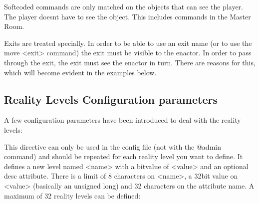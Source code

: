 \documentclass[letterpaper,10pt,english]{sphinxmanual}
\begin{document}
\sphinxAtStartPar
Softcoded commands are only matched on the objects that can see the player.
The player doesn\textquotesingle{}t have to see the object. This includes commands in the
Master Room.

\sphinxAtStartPar
Exits are treated specially. In order to be able to use an exit name (or to
use the \textquotesingle{}move \textless{}exit\textgreater{}\textquotesingle{} command) the exit must be visible to the enactor. In
order to pass through the exit, the exit must see the enactor in turn. There
are reasons for this, which will become evident in the examples below.


\subsection{Reality Levels Configuration parameters}
\label{\detokenize{advanced:reality-levels-configuration-parameters}}
\sphinxAtStartPar
A few configuration parameters have been introduced to deal with the reality
levels:

\begin{sphinxVerbatim}[commandchars=\\\{\}]
   \PYG{p}{[}  \PYG{p}{]}
\end{sphinxVerbatim}

\sphinxAtStartPar
This directive can only be used in the config file (not with the @admin
command) and should be repeated for each reality level you want to define.
It defines a new level named \textless{}name\textgreater{} with a bitvalue of \textless{}value\textgreater{} and an
optional desc attribute. There is a limit of 8 characters on \textless{}name\textgreater{}, a
32\sphinxhyphen{}bit value on \textless{}value\textgreater{} (basically an unsigned long) and 32 characters on
the attribute name. A maximum of 32 reality levels can be defined:

\begin{sphinxVerbatim}[commandchars=\\\{\}]
 
 
 
 
 
 
 
 
\end{sphinxVerbatim}
\end{document}
